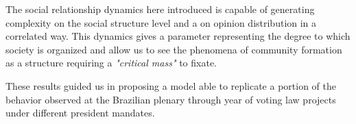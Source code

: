 \documentclass[nobib,a4,twosided,justified]{tufte-book}
\begin{document}
The social relationship dynamics here introduced is capable of generating complexity on the social structure level and a on opinion distribution in a correlated way.
This dynamics gives a parameter representing the degree to which society is organized and allow us to see the phenomena of community formation as a structure requiring a \emph{"critical mass"} to fixate.

These results guided us in proposing a model able to replicate a portion of the behavior observed at the Brazilian plenary through year of voting law projects under different president mandates.

\tableofcontents

\mainmatter










\backmatter
\printbibliography
\end{document}
